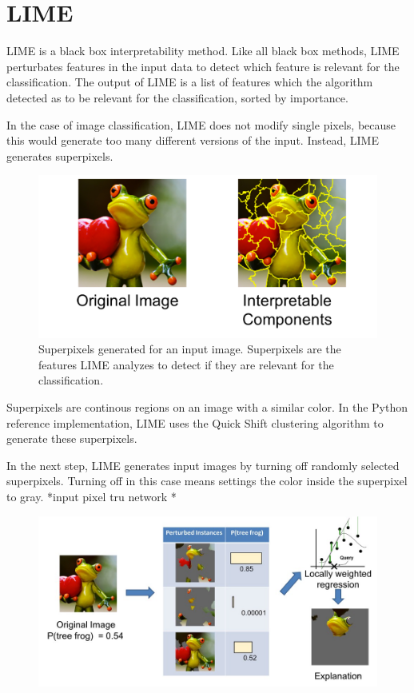 \section{LIME}

LIME \cite{ribeiro2016should} is a black box interpretability method. Like all black box methods, LIME perturbates features in the input data to detect which feature is relevant for the classification. The output of LIME is a list of features which the algorithm detected as to be relevant for the classification, sorted by importance.

In the case of image classification, LIME does not modify single pixels, because this would generate too many different versions of the input.
Instead, LIME generates superpixels.

\begin{figure}[H]
\centering
\includegraphics[width=12cm]{chapters/02_methods/images/lime.jpg}
\caption{Superpixels generated for an input image. Superpixels are the features LIME analyzes to detect if they are relevant for the classification.}
\end{figure}

Superpixels are continous regions on an image with a similar color. In the Python reference implementation, LIME uses the Quick Shift \cite{vedaldi2008quick} clustering algorithm to generate these superpixels.

In the next step, LIME generates input images by turning off randomly selected superpixels. Turning off in this case means settings the color inside the superpixel to gray.
*input pixel tru network
*

\begin{figure}[H]
\centering
\includegraphics[width=14cm]{chapters/02_methods/images/lime2.jpg}
\caption{}
\end{figure}



